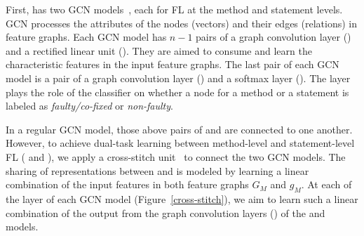 





 First, {\tool}
has two GCN models~\cite{kipf2016semi}, each for FL at the method and
statement levels. GCN processes the attributes of the nodes (vectors)
and their edges (relations) in feature graphs. Each GCN model has
$n-1$ pairs of a graph convolution layer () and a rectified
linear unit (). They are aimed to consume and learn the
characteristic features in the input feature graphs. The last pair of
each GCN model is a pair of a graph convolution layer ()
and a softmax layer (). The  layer plays
the role of the classifier on whether a node for a method or a
statement is labeled as {\em faulty/co-fixed} or {\em non-faulty}.



 In a
regular GCN model, those above pairs of  and 
are connected to one another. However, to achieve dual-task learning
between method-level and statement-level FL ( and
), we apply a cross-stitch unit~\cite{misra2016cross} to
connect the two GCN models. The sharing of representations between
 and  is modeled by learning a linear
combination of the input features in both feature graphs $G_M$ and
$g_M$. At each of the  layer of each GCN model
(Figure~\ref{cross-stitch}), we aim to learn such a linear combination
of the output from the graph convolution layers () of the
 and  models.

